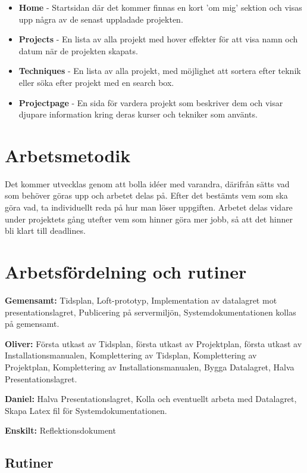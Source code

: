 \documentclass{TDP003mall}
\begin{document}
\begin{itemize}

  \item \textbf{Home} - Startsidan där det kommer finnas en kort 'om mig' sektion och visas upp några av de senast uppladade projekten.

  \item \textbf{Projects} - En lista av alla projekt med hover effekter för att visa namn och datum när de projekten skapats.

  \item \textbf{Techniques} - En lista av alla projekt, med möjlighet att sortera efter teknik eller söka efter projekt med en search box.

  \item \textbf{Projectpage} - En sida för vardera projekt som beskriver dem och visar djupare information kring deras kurser och tekniker som använts.

\end{itemize}

\section{Arbetsmetodik}
Det kommer utvecklas genom att bolla idéer med varandra, därifrån sätts vad som behöver göras upp och arbetet delas på.
Efter det bestämts vem som ska göra vad, ta individuellt reda på hur man löser uppgiften.
Arbetet delas vidare under projektets gång utefter vem som hinner göra mer jobb, så att det hinner bli klart till deadlines.

\section{Arbetsfördelning och rutiner}
\textbf{Gemensamt:} Tidsplan, Loft-prototyp, Implementation av datalagret mot presentationslagret, Publicering på servermiljön, Systemdokumentationen kollas på gemensamt.

\textbf{Oliver:} Första utkast av Tidsplan, första utkast av Projektplan, första utkast av Installationsmanualen, Komplettering av Tidsplan, Komplettering av Projektplan, Komplettering av Installationsmanualen, Bygga Datalagret, Halva Presentationslagret.

\textbf{Daniel:} Halva Presentationslagret, Kolla och eventuellt arbeta med Datalagret, Skapa Latex fil för Systemdokumentationen.

\textbf{Enskilt:} Reflektionsdokument

\subsection{Rutiner} 
\end{document}
